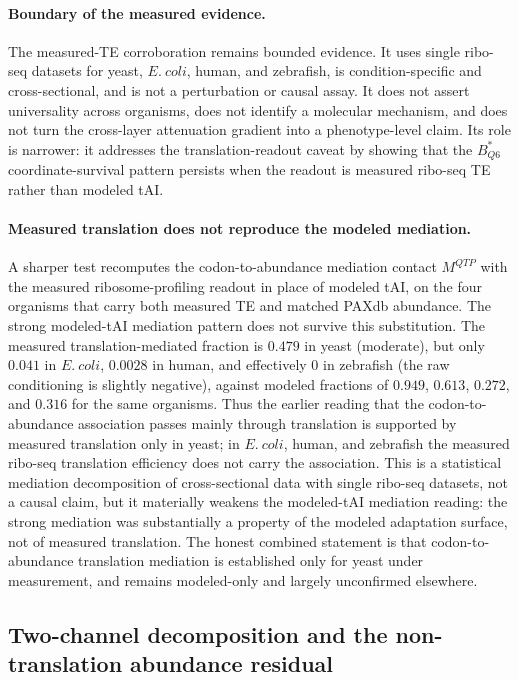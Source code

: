 \paragraph{Boundary of the measured evidence.}
The measured-TE corroboration remains bounded evidence.  It uses single ribo-seq datasets for yeast, $E.\ coli$, human, and zebrafish, is condition-specific and cross-sectional, and is not a perturbation or causal assay.  It does not assert universality across organisms, does not identify a molecular mechanism, and does not turn the cross-layer attenuation gradient into a phenotype-level claim.  Its role is narrower: it addresses the translation-readout caveat by showing that the $B^*_{Q6}$ coordinate-survival pattern persists when the readout is measured ribo-seq TE rather than modeled tAI.

\paragraph{Measured translation does not reproduce the modeled mediation.}
A sharper test recomputes the codon-to-abundance mediation contact $M^{QTP}$ with the measured ribosome-profiling readout in place of modeled tAI, on the four organisms that carry both measured TE and matched PAXdb abundance.  The strong modeled-tAI mediation pattern does not survive this substitution.  The measured translation-mediated fraction is $0.479$ in yeast (moderate), but only $0.041$ in $E.\ coli$, $0.0028$ in human, and effectively $0$ in zebrafish (the raw conditioning is slightly negative), against modeled fractions of $0.949$, $0.613$, $0.272$, and $0.316$ for the same organisms.  Thus the earlier reading that the codon-to-abundance association passes mainly through translation is supported by measured translation only in yeast; in $E.\ coli$, human, and zebrafish the measured ribo-seq translation efficiency does not carry the association.  This is a statistical mediation decomposition of cross-sectional data with single ribo-seq datasets, not a causal claim, but it materially weakens the modeled-tAI mediation reading: the strong mediation was substantially a property of the modeled adaptation surface, not of measured translation.  The honest combined statement is that codon-to-abundance translation mediation is established only for yeast under measurement, and remains modeled-only and largely unconfirmed elsewhere.

\subsection{Two-channel decomposition and the non-translation abundance residual}

